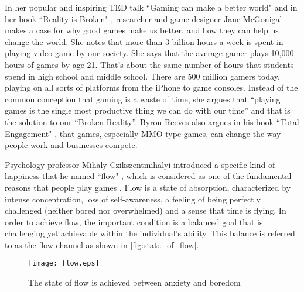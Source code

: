 In her popular and inspiring TED talk ``Gaming can make a better world" \cite {mcgonigal2010ted} and in her book ``Reality is Broken" \cite {mcgonigal2011reality}, researcher and game designer Jane McGonigal makes a case for why good games make us better, and how they can help us change the world. She notes that more than 3 billion hours a week is spent in playing video game by our society. She says that the average gamer plays 10,000 hours of games by age 21. That's about the same number of hours that students spend in high school and middle school. There are 500 million gamers today, playing on all sorts of platforms from the iPhone to game consoles. Instead of the common conception that gaming is a waste of time, she argues that ``playing games is the single most productive thing we can do with our time'' and that is  the solution to our ``Broken Reality''. Byron Reeves also argues in his book ``Total Engagement" \cite {reeves2009total}, that games, especially MMO type games, can change the way people work and businesses compete.

Psychology professor Mihaly Czikszentmihalyi introduced a specific kind of happiness that he named ``flow" \cite{csikszentmihalyi1991flow}, which is considered as one of the fundamental reasons that people play games \cite{murphygames}. Flow is a state of absorption, characterized by intense concentration, loss of self-awareness, a feeling of being perfectly challenged (neither bored nor overwhelmed) and a sense that time is flying. In order to achieve flow, the important condition is a balanced goal that is challenging yet achievable within the individual's ability. This balance is referred to as the flow channel as shown in \autoref{fig:state_of_flow}.

\begin{figure}[ht!]
	\centering
		\texttt{[image: flow.eps]}
		\caption{The state of flow is achieved between anxiety and boredom \cite{csikszentmihalyi1991flow}}
		\label{fig:state_of_flow}
\end{figure}

